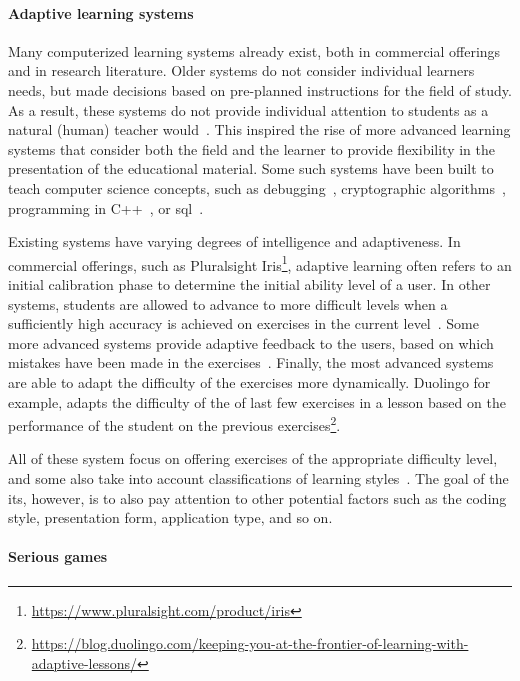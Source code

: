 \paragraph{Adaptive learning systems}
Many computerized learning systems already exist, both in commercial offerings and in research literature.
Older systems do not consider individual learners needs, but made decisions based on pre-planned instructions for the field of study.
As a result, these systems do not provide individual attention to students as a natural (human) teacher would~\cite{mahdi2016intelligent}.
This inspired the rise of more advanced learning systems that consider both the field and the learner to provide flexibility in the presentation of the educational material.
Some such systems have been built to teach computer science concepts, such as debugging~\cite{carter2013tutoring}, cryptographic algorithms~\cite{abuel2018intelligent,mahdi2016intelligent}, programming in C++~\cite{abu2009evaluating}, or \gls{sql}~\cite{mitrovic2003intelligent}.

Existing systems have varying degrees of intelligence and adaptiveness.
In commercial offerings, such as Pluralsight Iris\footnote{\url{https://www.pluralsight.com/product/iris}}, adaptive learning often refers to an initial calibration phase to determine the initial ability level of a user.
In other systems, students are allowed to advance to more difficult levels when a sufficiently high accuracy is achieved on exercises in the current level~\cite{abu2009evaluating,mahdi2016intelligent}.
Some more advanced systems provide adaptive feedback to the users, based on which mistakes have been made in the exercises~\cite{carter2013tutoring,abuel2018intelligent}.
Finally, the most advanced systems are able to adapt the difficulty of the exercises more dynamically.
Duolingo for example, adapts the difficulty of the of last few exercises in a lesson based on the performance of the student on the previous exercises\footnote{\url{https://blog.duolingo.com/keeping-you-at-the-frontier-of-learning-with-adaptive-lessons/}}.

All of these system focus on offering exercises of the appropriate difficulty level, and some also take into account classifications of learning styles~\cite{alshammari2015design,felder1988learning}.
The goal of the \gls{its}, however, is to also pay attention to other potential factors such as the coding style, presentation form, application type, and so on.

\paragraph{Serious games}

